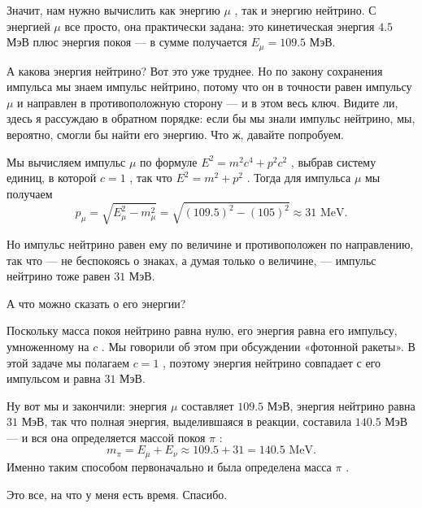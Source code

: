 \documentclass[11pt,oneside]{article}
\begin{document}
Значит, нам нужно вычислить как энергию \(\mu\) , так и энергию нейтрино. С энергией \(\mu\) все просто, она практически задана: это кинетическая энергия \(4.5\) МэВ плюс энергия покоя --- в сумме получается \(E_\mu=109.5\) МэВ.\par

А какова энергия нейтрино? Вот это уже труднее. Но по закону сохранения импульса мы знаем импульс нейтрино, потому что он в точности равен импульсу \(\mu\) и направлен в противоположную сторону --- и в этом весь ключ. Видите ли, здесь я рассуждаю в обратном порядке: если бы мы знали импульс нейтрино, мы, вероятно, смогли бы найти его энергию. Что ж, давайте попробуем.\par

Мы вычисляем импульс \(\mu\) по формуле \(E^2 = m^2c^4 + p^2c^2\) , выбрав систему единиц, в которой \(c=1\) , так что \(E^2 = m^2 + p^2\) . Тогда для импульса \(\mu\) мы получаем 
\begin{equation*} \tag{3.35}
\label{Eq:TIPS:3:35} p_\mu = \sqrt{E_\mu^2-m_\mu^2} = \sqrt{(109.5)^2-(105)^2} \approx 31\text{ MeV}. \end{equation*}
\par

Но импульс нейтрино равен ему по величине и противоположен по направлению, так что --- не беспокоясь о знаках, а думая только о величине, --- импульс нейтрино тоже равен \(31\) МэВ.\par

А что можно сказать о его энергии?\par

Поскольку масса покоя нейтрино равна нулю, его энергия равна его импульсу, умноженному на \(c\) . Мы говорили об этом при обсуждении «фотонной ракеты». В этой задаче мы полагаем \(c=1\) , поэтому энергия нейтрино совпадает с его импульсом и равна \(31\) МэВ.\par

Ну вот мы и закончили: энергия \(\mu\) составляет \(109.5\) МэВ, энергия нейтрино равна \(31\) МэВ, так что полная энергия, выделившаяся в реакции, составила \(140.5\) МэВ --- и вся она определяется массой покоя \(\pi\) : 
\begin{equation*} \tag{3.36}
\label{Eq:TIPS:3:36} m_\pi = E_\mu + E_\nu \approx 109.5 + 31 = 140.5\text{ MeV}. \end{equation*}
 Именно таким способом первоначально и была определена масса \(\pi\) .\par

Это все, на что у меня есть время. Спасибо.\par
\end{document}
